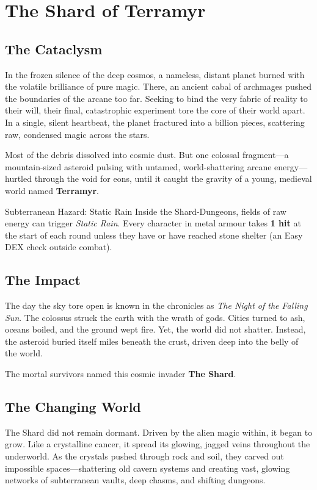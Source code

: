 \section{The Shard of Terramyr}

\subsection{The Cataclysm}
In the frozen silence of the deep cosmos, a nameless, distant planet burned with the volatile brilliance of pure magic. There, an ancient cabal of archmages pushed the boundaries of the arcane too far. Seeking to bind the very fabric of reality to their will, their final, catastrophic experiment tore the core of their world apart. In a single, silent heartbeat, the planet fractured into a billion pieces, scattering raw, condensed magic across the stars.

Most of the debris dissolved into cosmic dust. But one colossal fragment—a mountain-sized asteroid pulsing with untamed, world-shattering arcane energy—hurtled through the void for eons, until it caught the gravity of a young, medieval world named \textbf{Terramyr}.

\begin{hazardbox}{Subterranean Hazard: Static Rain}
    Inside the Shard-Dungeons, fields of raw energy can trigger \textit{Static Rain}.
    Every character in metal armour takes \textbf{1 hit} at the start of each round
    unless they have  or have reached stone shelter (an Easy DEX check outside combat).
\end{hazardbox}

\subsection{The Impact}
The day the sky tore open is known in the chronicles as \textit{The Night of the Falling Sun}. The colossus struck the earth with the wrath of gods. Cities turned to ash, oceans boiled, and the ground wept fire. Yet, the world did not shatter. Instead, the asteroid buried itself miles beneath the crust, driven deep into the belly of the world. 

The mortal survivors named this cosmic invader \textbf{The Shard}.

\subsection{The Changing World}
The Shard did not remain dormant. Driven by the alien magic within, it began to grow. Like a crystalline cancer, it spread its glowing, jagged veins throughout the underworld. As the crystals pushed through rock and soil, they carved out impossible spaces—shattering old cavern systems and creating vast, glowing networks of subterranean vaults, deep chasms, and shifting dungeons. 

